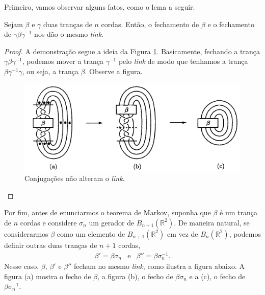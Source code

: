 	\par\vspace{0.3cm} Primeiro, vamos observar alguns fatos, como o lema a seguir.
	\begin{lemma}
	\label{conjugacoes dao o mesmo link}
		Sejam $\beta$ e $\gamma$ duas tranças de $n$ cordas. Então, o fechamento de $\beta$ 
		e o fechamento de $\gamma\beta\gamma^{-1}$ nos dão o mesmo \textit{link}.
	\end{lemma}
	\begin{proof}
		A demonstração segue a ideia da Figura \ref{conjugacao nao altera link}. 
		Basicamente, fechando a trança $\gamma\beta\gamma^{-1}$, podemos mover 
		a trança $\gamma^{-1}$ pelo \textit{link} de modo que tenhamos a trança 
		$\beta\gamma^{-1}\gamma$, ou seja, a trança  $\beta$. Observe a figura.
		\begin{figure}[H]
			\begin{center}
				\includegraphics[width=12cm]{Images/conjugacao_nao_altera_link.png}
			\end{center}\caption{Conjugações não alteram o \textit{link}.}
			\label{conjugacao nao altera link}
		\end{figure}
	\end{proof} 
	Por fim, antes de enunciarmos o teorema de Markov, suponha que $\beta$ é um trança de $n$
	cordas e considere $\sigma_n$ um gerador de $B_{n+1}(\mathbb{R}^2)$. De maneira natural, 
	se considerarmos $\beta$ como um elemento de $B_{n+1}(\mathbb{R}^2)$ em vez de $B_n(\mathbb{R}^2)$, 
	podemos definir outras duas tranças de $n+1$ cordas,
	\[
    	\begin{array}{ccc}
    	    \beta' = \beta\sigma_n & \text{e} & \beta'' = \beta\sigma_n^{-1}.
    	\end{array}
	\]
	Nesse caso, $\beta$, $\beta'$ e $\beta''$ fecham no mesmo \textit{link}, como ilustra a figura abaixo. 
	A figura (a) mostra o fecho de $\beta$, a figura (b), o fecho de $\beta\sigma_n$ e a (c), 
	o fecho de $\beta\sigma_n^{-1}$.
